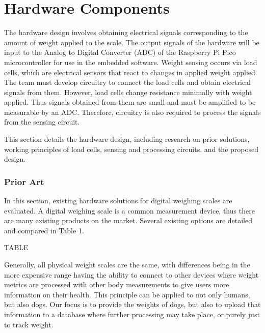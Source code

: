
\chapter{Hardware Components}

The hardware design involves obtaining electrical signals corresponding to the amount of weight applied to the scale. The output signals of the hardware will be input to the Analog to Digital Converter (ADC) of the Raspberry Pi Pico microcontroller for use in the embedded software. Weight sensing occurs via load cells, which are electrical sensors that react to changes in applied weight applied. The team must develop circuitry to connect the load cells and obtain electrical signals from them. However, load cells change resistance minimally with weight applied. Thus signals obtained from them are small and must be amplified to be measurable by an ADC. Therefore, circuitry is also required to process the signals from the sensing circuit.

This section details the hardware design, including research on prior solutions, working principles of load cells, sensing and processing circuits, and the proposed design.

\subsection{Prior Art}
In this section, existing hardware solutions for digital weighing scales are evaluated. A digital weighing scale is a common measurement device, thus there are many existing products on the market. Several existing options are detailed and compared in Table 1.

TABLE

Generally, all physical weight scales are the same, with differences being in the more expensive range having the ability to connect to other devices where weight metrics are processed with other body measurements to give users more information on their health. This principle can be applied to not only humans, but also dogs. Our focus is to provide the weights of dogs, but also to upload that information to a database where further processing may take place, or purely just to track weight.


